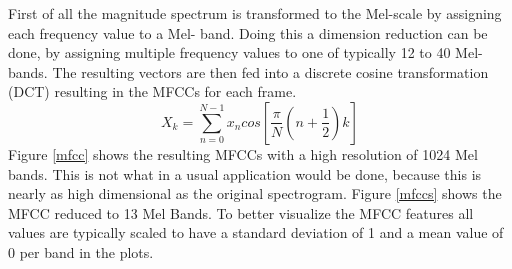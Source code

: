 \FloatBarrier
\noindent First of all the magnitude spectrum is transformed to the Mel-scale by assigning each frequency value to a Mel- band.
Doing this a dimension reduction can be done, by assigning multiple frequency values to one of typically 12 to 40 Mel-bands. The resulting vectors are then fed into a discrete cosine transformation (DCT) resulting in the MFCCs for each frame. 
\begin{equation} \label{eq:dct}
X_k = \sum_{n=0}^{N-1}{x_n cos\left[{\frac{\pi}{N}(n + \frac{1}{2})k}\right]}
\end{equation}
Figure \ref{mfcc} shows the resulting MFCCs with a high resolution of 1024 Mel bands. This is not what in a usual application would be done, because this is nearly as high dimensional as the original spectrogram. Figure \ref{mfccs} shows the MFCC reduced to 13 Mel Bands.
To better visualize the MFCC features all values are typically scaled to have a standard deviation of 1 and a mean value of 0 per band in the plots. 
